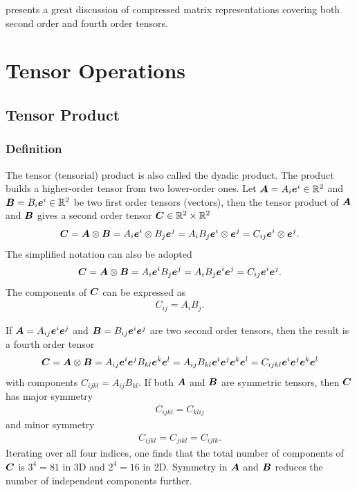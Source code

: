 \cite{Helnwein2001} presents a great discussion of compressed matrix representations covering both second order and fourth order tensors.
\section{Tensor Operations}
\subsection{Tensor Product}
\subsubsection{Definition}
The tensor (tensorial) product is also called the dyadic product.
The product builds a higher-order tensor from two lower-order ones.
Let $\bm{A}=A_i\bm{e}^i\in\mathbb{R}^2$ and $\bm{B}=B_i\bm{e}^i\in\mathbb{R}^2$ be two first order tensors (vectors), then the tensor product of $\bm{A}$ and $\bm{B}$ gives a second order tensor $\bm{C}\in\mathbb{R}^2\times\mathbb{R}^2$
\begin{gather}
\bm{C}=\bm{A}\otimes\bm{B}=A_i\bm{e}^i\otimes{}B_j\bm{e}^j=A_iB_j\bm{e}^i\otimes{}\bm{e}^j=C_{ij}\bm{e}^i\otimes{}\bm{e}^j.
\end{gather}
The simplified notation can also be adopted
\begin{gather}\label{eq:1st_tensor_product}
\bm{C}=\bm{A}\otimes\bm{B}=A_i\bm{e}^iB_j\bm{e}^j=A_iB_j\bm{e}^i\bm{e}^j=C_{ij}\bm{e}^i\bm{e}^j.
\end{gather}
The components of $\bm{C}$ can be expressed as
\begin{gather}
C_{ij}=A_{i}B_{j}.
\end{gather}

If $\bm{A}=A_{ij}\bm{e}^i\bm{e}^j$ and $\bm{B}=B_{ij}\bm{e}^i\bm{e}^j$ are two second order tensors, then the result is a fourth order tensor
\begin{gather}\label{eq:2nd_tensor_product}
\bm{C}=\bm{A}\otimes\bm{B}=A_{ij}\bm{e}^i\bm{e}^jB_{kl}\bm{e}^k\bm{e}^l=A_{ij}B_{kl}\bm{e}^i\bm{e}^j\bm{e}^k\bm{e}^l=C_{ijkl}\bm{e}^i\bm{e}^j\bm{e}^k\bm{e}^l
\end{gather}
with components $C_{ijkl}=A_{ij}B_{kl}$.
If both $\bm{A}$ and $\bm{B}$ are symmetric tensors, then $\bm{C}$ has major symmetry
\begin{gather}
C_{ijkl}=C_{klij}
\end{gather}
and minor symmetry
\begin{gather}
C_{ijkl}=C_{jikl}=C_{ijlk}.
\end{gather}
Iterating over all four indices, one finds that the total number of components of $\bm{C}$ is $3^4=81$ in 3D and $2^4=16$ in 2D.
Symmetry in $\bm{A}$ and $\bm{B}$ reduces the number of independent components further.

